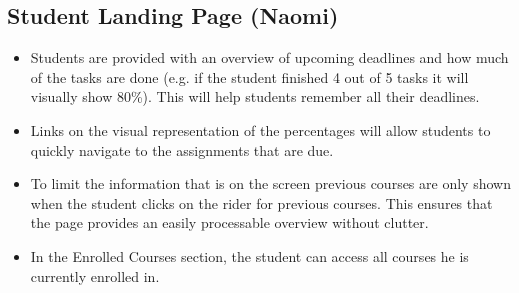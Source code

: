 \subsection{Student Landing Page (Naomi)}

\begin{itemize}

\item Students are provided with an overview of upcoming deadlines and how much of the tasks are done (e.g. if the student finished 4 out of 5 tasks it will visually show 80\%). This will help students remember all their deadlines.

\item Links on the visual representation of the percentages will allow students to quickly navigate to the assignments that are due.

\item To limit the information that is on the screen previous courses are only shown when the student clicks on the rider for previous courses. This ensures that the page provides an easily processable overview without clutter.

\item In the Enrolled Courses section, the student can access all courses he is currently enrolled in.

\end{itemize}
